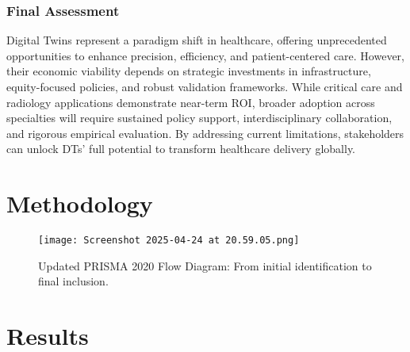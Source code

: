 \documentclass[10pt,a4paper]{article}
\begin{document}
\subsubsection*{Final Assessment}

Digital Twins represent a paradigm shift in healthcare, offering unprecedented opportunities to enhance precision, efficiency, and patient-centered care. However, their economic viability depends on strategic investments in infrastructure, equity-focused policies, and robust validation frameworks. While critical care and radiology applications demonstrate near-term ROI, broader adoption across specialties will require sustained policy support, interdisciplinary collaboration, and rigorous empirical evaluation. By addressing current limitations, stakeholders can unlock DTs’ full potential to transform healthcare delivery globally.


\newpage
\appendix

\section{Methodology}

\begin{figure}[H]
    \centering
    \texttt{[image: Screenshot 2025-04-24 at 20.59.05.png]}
    \caption{Updated PRISMA 2020 Flow Diagram: From initial identification to final inclusion.}
    \label{fig:prisma}
\end{figure}

\section{Results}
\end{document}
